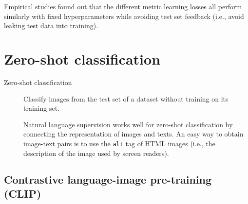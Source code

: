 \begin{remark}
    Empirical studies found out that the different metric learning losses all perform similarly with fixed hyperparameters while avoiding test set feedback (i.e., avoid leaking test data into training).
\end{remark}




\section{Zero-shot classification}

\begin{description}
    \item[Zero-shot classification] 
        Classify images from the test set of a dataset without training on its training set.

        \begin{remark}
            Natural language supervision works well for zero-shot classification by connecting the representation of images and texts. An easy way to obtain image-text pairs is to use the \texttt{alt} tag of HTML images (i.e., the description of the image used by screen readers).
        \end{remark}
\end{description}


\subsection{Contrastive language-image pre-training (CLIP)}

